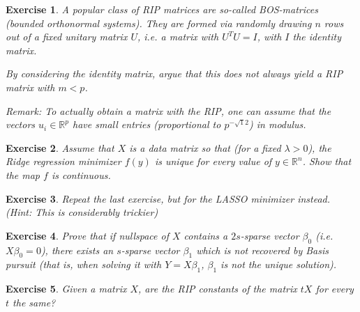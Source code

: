 \documentclass{article}
\newcommand{\R}{\mathbb{R}}
\newtheorem{exercise}{Exercise}
\begin{document}
\begin{exercise}
    A popular class of RIP matrices are so-called \emph{BOS}-matrices (bounded orthonormal systems). They are formed via randomly drawing $n$ rows out of a fixed unitary matrix $U$, i.e. a matrix with $U^TU=I$, with $I$ the identity matrix.

    By considering the identity matrix, argue that this does not always yield a RIP matrix with $m<p$. 
    
    \emph{Remark:} To actually obtain a matrix with the RIP, one can assume that the vectors $u_i \in \R^p$ have small entries (proportional to $p^{-\sqrt{1}{2}}$) in modulus.
\end{exercise}

\begin{exercise}
    Assume that $X$ is a data matrix so that (for a fixed $\lambda>0$), the Ridge regression minimizer $f(y)$ is unique for every value of $y \in \R^n$. Show that the map $f$ is continuous. 
\end{exercise}

\begin{exercise}
    Repeat the last exercise, but for the LASSO minimizer instead. (\emph{Hint}: This is considerably trickier)
\end{exercise}

\begin{exercise}
    Prove that if nullspace of $X$ contains a $2s$-sparse vector $\beta_0$ (i.e. $X\beta_0=0$), there exists an $s$-sparse vector $\beta_1$ which is not recovered by Basis pursuit (that is, when solving it with $Y=X\beta_1$, $\beta_1$ is not the unique solution).
\end{exercise}

\begin{exercise}
    Given a matrix $X$, are the RIP constants of the matrix $tX$ for every $t$ the same? 
\end{exercise}
\end{document}
